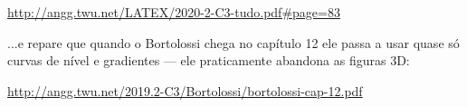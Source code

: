 \documentclass[oneside,12pt]{article}
\begin{document}
{{\ssk

{\scriptsize

\url{http://angg.twu.net/LATEX/2020-2-C3-tudo.pdf\#page=83}

}

\bsk


...e repare que quando o Bortolossi chega no capítulo 12 ele passa a
usar quase só curvas de nível e gradientes --- ele praticamente
abandona as figuras 3D:

\ssk

{\scriptsize

\url{http://angg.twu.net/2019.2-C3/Bortolossi/bortolossi-cap-12.pdf}

}



}}





\end{document}
